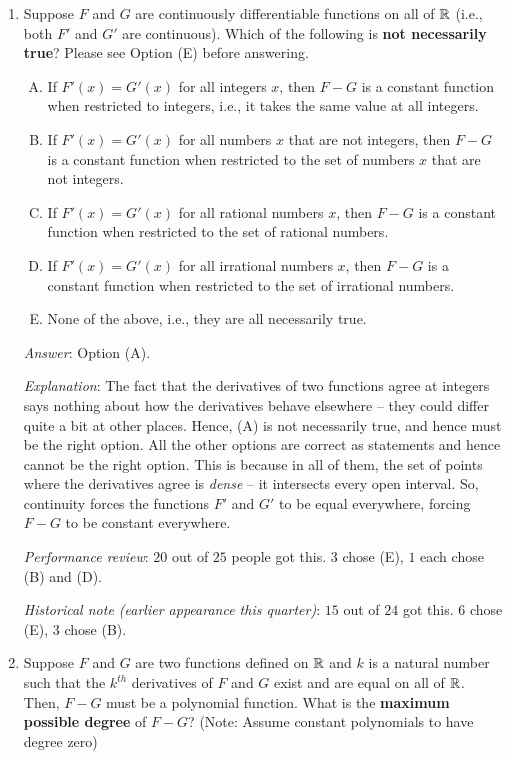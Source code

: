 \documentclass[10pt]{amsart}
\begin{document}
\begin{enumerate}

\item Suppose $F$ and $G$ are continuously differentiable functions on
  all of $\mathbb{R}$ (i.e., both $F'$ and $G'$ are continuous). Which of the
  following is {\bf not necessarily true}? Please see Option (E)
  before answering.

  \begin{enumerate}[(A)]
  \item If $F'(x) = G'(x)$ for all integers $x$, then $F - G$ is a
    constant function when restricted to integers, i.e., it takes the
    same value at all integers.
  \item If $F'(x) = G'(x)$ for all numbers $x$ that are not integers,
    then $F - G$ is a constant function when restricted to the set of
    numbers $x$ that are not integers.
  \item If $F'(x) = G'(x)$ for all rational numbers $x$, then $F - G$
    is a constant function when restricted to the set of rational
    numbers.
  \item If $F'(x) = G'(x)$ for all irrational numbers $x$, then $F -
    G$ is a constant function when restricted to the set of irrational
    numbers.
  \item None of the above, i.e., they are all necessarily true.
  \end{enumerate}

  {\em Answer}: Option (A).

  {\em Explanation}: The fact that the derivatives of two functions
  agree at integers says nothing about how the derivatives behave
  elsewhere -- they could differ quite a bit at other places. Hence,
  (A) is not necessarily true, and hence must be the right option. All
  the other options are correct as statements and hence cannot be the
  right option. This is because in all of them, the set of points
  where the derivatives agree is {\em dense} -- it intersects every
  open interval. So, continuity forces the functions $F'$ and $G'$ to
  be equal everywhere, forcing $F - G$ to be constant everywhere.

  {\em Performance review}: $20$ out of $25$ people got this. $3$
  chose (E), $1$ each chose (B) and (D).

  {\em Historical note (earlier appearance this quarter)}: $15$ out of
  $24$ got this. $6$ chose (E), $3$ chose (B).

\item Suppose $F$ and $G$ are two functions defined on $\mathbb{R}$ and $k$ is
  a natural number such that the $k^{th}$ derivatives of $F$ and $G$
  exist and are equal on all of $\mathbb{R}$. Then, $F - G$ must be a
  polynomial function. What is the {\bf maximum possible degree} of $F
  - G$?  (Note: Assume constant polynomials to have degree zero)


\end{enumerate}
\end{document}
